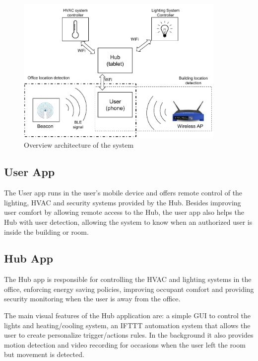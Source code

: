 \begin{figure}[h]
\centering
\includegraphics[width=0.9\textwidth]{Figures/harware_arch}
\caption{Overview architecture of the system}
\label{software1}
\end{figure}


\subsection{User App}

The User app runs in the user's mobile device and offers remote control of the lighting, \ac{HVAC} and security systems provided by the Hub. Besides improving user comfort by allowing remote access to the Hub, the user app also helps the Hub with user detection, allowing the system to know when an authorized user is inside the building or room.



\subsection{Hub App}

The Hub app is responsible for controlling the \ac{HVAC} and lighting systems in the office, enforcing energy saving policies, improving occupant comfort and providing security monitoring when the user is away from the office.

The main visual features of the Hub application are: a simple \ac{GUI} to control the lights and heating/cooling system, an \ac{IFTTT} automation system that allows the user to create personalize trigger/actions rules. In the background it also provides motion detection and video recording for occasions when the user left the room but movement is detected.


